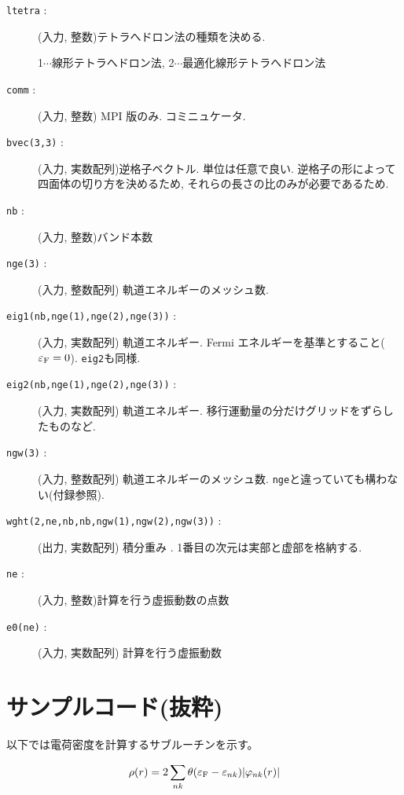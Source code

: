 \documentclass[12pt]{jarticle}
\begin{document}
\begin{description}
\item[\texttt{ltetra} : ] (入力, 整数)テトラへドロン法の種類を決める. 
  
  1$\cdots$線形テトラへドロン法, 
  2$\cdots$最適化線形テトラへドロン法
\item[\texttt{comm} : ] (入力, 整数) MPI 版のみ. コミニュケータ. 
\item[\texttt{bvec(3,3)} : ] (入力, 実数配列)逆格子ベクトル. 単位は任意で良い. 
  逆格子の形によって四面体の切り方を決めるため, それらの長さの比のみが必要であるため. 
\item[\texttt{nb} : ] (入力, 整数)バンド本数
\item[\texttt{nge(3)} : ] (入力, 整数配列) 軌道エネルギーのメッシュ数. 
\item[\texttt{eig1(nb,nge(1),nge(2),nge(3))} : ] (入力, 実数配列) 軌道エネルギー. 
  Fermi エネルギーを基準とすること($\varepsilon_{\rm F}=0$). \verb|eig2|も同様. 
\item[\texttt{eig2(nb,nge(1),nge(2),nge(3))} : ] (入力, 実数配列) 軌道エネルギー. 
  移行運動量の分だけグリッドをずらしたものなど. 
\item[\texttt{ngw(3)} : ] (入力, 整数配列) 軌道エネルギーのメッシュ数. 
  \verb|nge|と違っていても構わない(付録参照). 
\item[\texttt{wght(2,ne,nb,nb,ngw(1),ngw(2),ngw(3))} : ] (出力, 実数配列) 積分重み . 
  1番目の次元は実部と虚部を格納する. 
\item[\texttt{ne} : ] (入力, 整数)計算を行う虚振動数の点数
\item[\texttt{e0(ne)} : ] (入力, 実数配列) 計算を行う虚振動数
\end{description}

\newpage

\section{サンプルコード(抜粋)}

以下では電荷密度を計算するサブルーチンを示す。

\begin{align}
  \rho(r) = 2 \sum_{n k} \theta(\varepsilon_{\rm F} - \varepsilon_{n k}) |\varphi_{n k}(r)|
\end{align}
\end{document}
